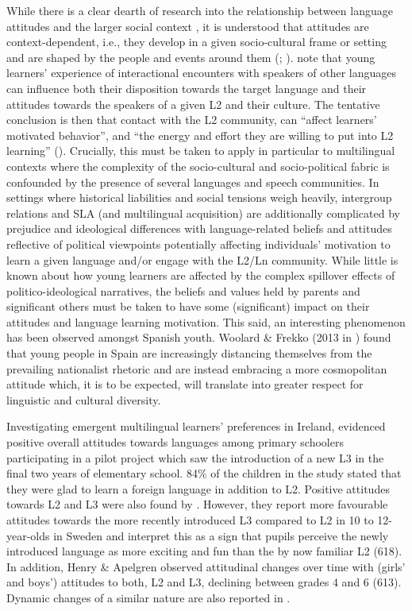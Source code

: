 \documentclass[output=paper]{../langscibook}
\begin{document}
While there is a clear dearth of research into the relationship between language attitudes and the larger social context \citep[28]{Enever2009}, it is understood that attitudes are context-dependent, i.e., they develop in a given socio-cultural frame or setting and are shaped by the people and events around them (\citealt[91]{JessnerMayer2017}; \citealt[25]{Munoz2014}). \citet{CsizerKormos2009} note that young learners’ experience of interactional encounters with speakers of other languages can influence both their disposition towards the target language and their attitudes towards the speakers of a given L2 and their culture. The tentative conclusion is then that contact with the L2 community, can “affect learners’ motivated behavior”, and “the energy and effort they are willing to put into L2 learning” (\citealt[63]{CsizerKormos2009}). Crucially, this must be taken to apply in particular to multilingual contexts where the complexity of the socio-cultural and socio-political fabric is confounded by the presence of several languages and speech communities. In settings where historical liabilities and social tensions weigh heavily, intergroup relations and SLA (and multilingual acquisition) are additionally complicated by prejudice and ideological differences with language-related beliefs and attitudes reflective of political viewpoints potentially affecting individuals’ motivation to learn a given language and/or engage with the L2/Ln community. While little is known about how young learners are affected by the complex spillover effects of politico-ideological narratives, the beliefs and values held by parents and significant others must be taken to have some (significant) impact on their attitudes and language learning motivation. This said, an interesting phenomenon has been observed amongst Spanish youth. Woolard \& Frekko (2013 in \citealt[586]{Lasagabaster2017}) found that young people in Spain are increasingly distancing themselves from the prevailing nationalist rhetoric and are instead embracing a more cosmopolitan attitude which, it is to be expected, will translate into greater respect for linguistic and cultural diversity. 

Investigating emergent multilingual learners’ preferences in Ireland, \citet[4]{HarrisEtAl2009} evidenced positive overall attitudes towards languages among primary schoolers participating in a pilot project which saw the introduction of a new L3 in the final two years of elementary school. 84\% of the children in the study stated that they were glad to learn a foreign language in addition to L2. Positive attitudes towards L2 and L3 were also found by \citet{HenryApelgren2008}. However, they report more favourable attitudes towards the more recently introduced L3 compared to L2 in 10 to 12-year-olds in Sweden and interpret this as a sign that pupils perceive the newly introduced language as more exciting and fun than the by now familiar L2 (618). In addition, Henry \& Apelgren observed attitudinal changes over time with (girls’ and boys’) attitudes to both, L2 and L3, declining between grades 4 and 6 (613). Dynamic changes of a similar nature are also reported in \citet[214]{Cenoz2004}. 
\end{document}
